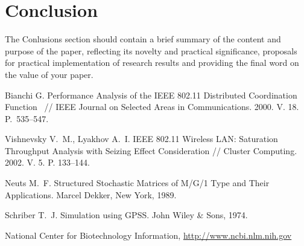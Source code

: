 \documentclass[11pt]{article}
\begin{document}
\section{Conclusion}
The Conlusions section should contain a brief summary of the content and purpose of the paper, reflecting its novelty and practical significance, proposals for practical implementation of research results and providing the final word on the value of your paper.

%
%

\begin{thebibliography}{99}
Bianchi G. Performance Analysis of the IEEE 802.11 Distributed
Coordination Function ~// IEEE Journal on Selected Areas in
Communications. 2000. V. 18. P.~535--547.

 Vishnevsky V.~M., Lyakhov A.~I. IEEE 802.11
    Wireless LAN: Saturation Throughput Analysis with Seizing
    Effect Consideration
// Cluster Computing. 2002. V. 5. P. 133--144.

 Neuts M.~F.  Structured Stochastic
    Matrices of M/G/1 Type and Their Applications. Marcel
    Dekker, New York, 1989.

 Schriber T.~J. Simulation using GPSS. John
    Wiley \& Sons, 1974.
    
 National Center for Biotechnology Information, \url{http://www.ncbi.nlm.nih.gov}

\end{thebibliography}
\end{document}
